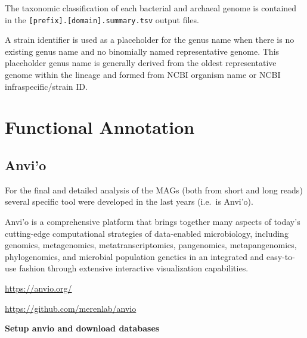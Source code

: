 \documentclass[
]{book}
\begin{document}
The taxonomic classification of each bacterial and archaeal genome is contained in the \texttt{{[}prefix{]}.{[}domain{]}.summary.tsv} output files.

A strain identifier is used as a placeholder for the genus name when there is no existing genus name and no binomially named representative genome.
This placeholder genus name is generally derived from the oldest representative genome within the lineage and formed from NCBI organism name or NCBI infraspecific/strain ID.

\section{Functional Annotation}\label{functional-annotation}

\subsection{Anvi'o}\label{anvio}

For the final and detailed analysis of the MAGs (both from short and long reads) several specific tool were developed in the last years (i.e.~is Anvi'o).

Anvi'o is a comprehensive platform that brings together many aspects of today's cutting-edge computational strategies of data-enabled microbiology, including genomics, metagenomics, metatranscriptomics, pangenomics, metapangenomics, phylogenomics, and microbial population genetics in an integrated and easy-to-use fashion through extensive interactive visualization capabilities.

\url{https://anvio.org/}

\url{https://github.com/merenlab/anvio}

\textbf{Setup anvio and download databases}
\end{document}
